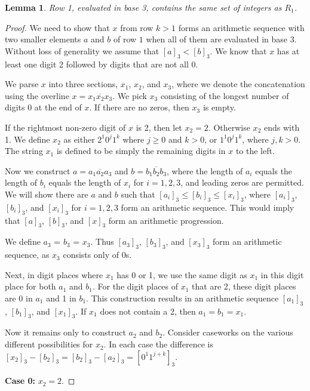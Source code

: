 \documentclass[12pt,reqno]{article}
\theoremstyle{plain}
\newtheorem{lemma}[theorem]{Lemma}
\theoremstyle{definition}
\theoremstyle{remark}
\begin{document}
\begin{lemma}
Row 1, evaluated in base 3, contains the same set of integers as $R_1$.
\end{lemma}
\begin{proof}
We need to show that $x$ from row $k>1$ forms an arithmetic sequence with two smaller elements $a$ and $b$ of row $1$ when all of them are evaluated in base 3. Without loss of generality we assume that $[a]_3<[b]_3$. We know that $x$ has at least one digit 2 followed by digits that are not all 0. 

We parse $x$ into three sections, $x_1$, $x_2$, and $x_3$, where we denote the concatenation using the overline $x = \overline{x_1 x_2 x_3}$. We pick $x_3$ consisting of the longest number of digits $0$ at the end of $x$. If there are no zeros, then $x_3$ is empty.

If the rightmost non-zero digit of $x$ is 2, then let $x_2 = 2$. Otherwise $x_2$ ends with 1. We define $x_2$ as either $2^1 0^j 1^k$ where $j \geq 0$ and $k> 0$, or $1^1 0^j 1^k$, where $j, k > 0$. The string $x_1$ is defined to be simply the remaining digits in $x$ to the left.

Now we construct $a = \overline{a_1 a_2 a_3}$ and $b = \overline{b_1 b_2 b_3}$, where the length of $a_i$ equals the length of $b_i$ equals the length of $x_i$ for $i= 1, 2, 3$, and leading zeros are permitted. We will show there are $a$ and $b$ such that $[a_i]_3 \leq [b_i]_3 \leq [x_i]_3$, where $[a_i]_3$, $[b_i]_3$, and $[x_i]_3$ for $i = 1,2,3$ form an arithmetic sequence. This would imply that $[a]_3$, $[b]_3$, and $[x]_3$ form an arithmetic progression.

We define $a_3$ = $b_3$ = $x_3$. Thus $[a_3]_3$, $[b_3]_3$, and $[x_3]_3$ form an arithmetic sequence, as $x_3$ consists only of 0s. 

Next, in digit places where $x_1$ has 0 or 1, we use the same digit as $x_1$ in this digit place for both $a_1$ and $b_1$. For the digit places of $x_1$ that are 2, these digit places are 0 in $a_1$ and 1 in $b_1$. This construction results in an arithmetic sequence $[a_1]_3$, $[b_1]_3$, and $[x_1]_3$. If $x_1$ does not contain a 2, then $a_1 = b_1 = x_1$.
    
Now it remains only to construct $a_2$ and $b_2$. Consider caseworks on the various different possibilities for $x_2$. In each case the difference is $[x_2]_3 - [b_2]_3 = [b_2]_3 - [a_2]_3 = [0^1  1^{j+k}]_3$. 

\textbf{Case 0:} $x_2=2$.


\end{proof}
\end{document}
